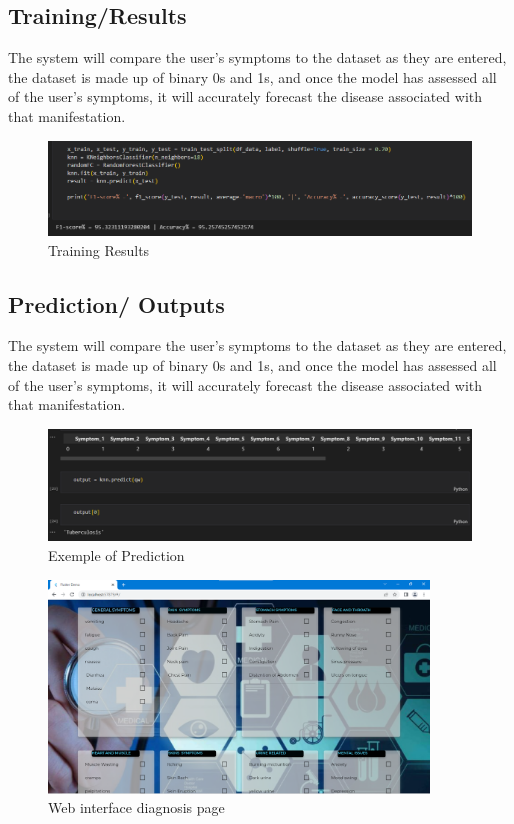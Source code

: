\subsection{Training/Results}
\label{sec:Training/Results}
The system will compare the user's symptoms to the dataset as they are entered, the dataset is made up of binary 0s and 1s, and once the model 
has assessed all of the user's symptoms, it will accurately forecast the disease associated with that manifestation.

\begin{figure}[htp]
    \centering
    \includegraphics[width=1.2\textwidth]{images/Traning.png}
    \caption{Training Results}
    \label{fig:example}
\end{figure}



\subsection{Prediction/ Outputs}
\label{sec:Prediction/ Outputs}
The system will compare the user's symptoms to the dataset as they are entered, the dataset is made up of binary 0s and 1s, and once the model 
has assessed all of the user's symptoms, it will accurately forecast the disease associated with that manifestation.

\begin{figure}[htp]
    \centering
    \includegraphics[width=1.2\textwidth]{images/prediction.png}
    \caption{Exemple of Prediction}
    \label{fig:example}
\end{figure}

\begin{figure}[htp]
    \centering
    \includegraphics[width=0.9\textwidth]{images/Web1.png}
    \caption{Web interface diagnosis page}
    \label{fig:example9}
\end{figure}

